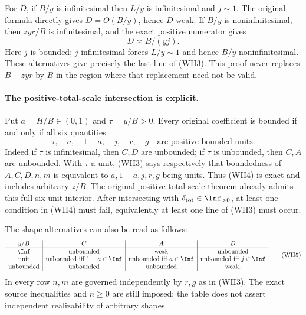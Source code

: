 For $D$, if $B/y$ is infinitesimal then $L/y$ is infinitesimal and
$j\sim1$. The original formula directly gives $D=O(B/y)$, hence
$D$ weak. If $B/y$ is noninfinitesimal, then $zyr/B$ is infinitesimal,
and the exact positive numerator gives
\[
 D\asymp B/(yj).
\]
Here $j$ is bounded; $j$ infinitesimal forces $L/y\sim1$ and hence
$B/y$ noninfinitesimal. These alternatives give precisely the last
line of (WII3). This proof never replaces $B-zyr$ by $B$ in the
region where that replacement need not be valid.

\paragraph{The positive-total-scale intersection is explicit.}
Put $a=H/B\in(0,1)$ and $\tau=y/B>0$. Every original coefficient is
bounded if and only if all six quantities
\[
 \tau,\quad a,\quad1-a,\quad j,\quad r,\quad g
 \quad\text{are positive bounded units}.          \tag{WII4}
\]
Indeed if $\tau$ is infinitesimal, then $C,D$ are unbounded; if
$\tau$ is unbounded, then $C,A$ are unbounded. With $\tau$ a unit,
(WII3) says respectively that boundedness of $A,C,D,n,m$ is
equivalent to $a,1-a,j,r,g$ being units. Thus (WII4) is exact and
includes arbitrary $z/B$. The original positive-total-scale theorem
already admits this full six-unit interior. After intersecting with
$\delta_{\rm tot}\in\Inf_{>0}$, at least one condition in (WII4)
must fail, equivalently at least one line of (WII3) must occur.

The shape alternatives can also be read as follows:
\[
\begin{array}{c|c|c|c}
 y/B&C&A&D\\ \hline
 \Inf&\text{unbounded}&\text{weak}&\text{unbounded}\\
 \text{unit}&\text{unbounded iff }1-a\in\Inf&
 \text{unbounded iff }a\in\Inf&
 \text{unbounded iff }j\in\Inf\\
 \text{unbounded}&\text{unbounded}&\text{unbounded}&\text{weak}.
\end{array}                                                     \tag{WII5}
\]
In every row $n,m$ are governed independently by $r,g$ as in (WII3).
The exact source inequalities and $n\geq0$ are still imposed; the
table does not assert independent realizability of arbitrary shapes.

